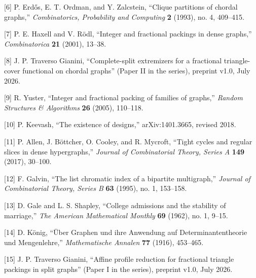\documentclass[
  11pt,
]{article}
\begin{document}
{[}6{]} P. Erdős, E. T. Ordman, and Y. Zalcstein, ``Clique partitions of
chordal graphs,'' \emph{Combinatorics, Probability and Computing}
\textbf{2} (1993), no. 4, 409--415.

{[}7{]} P. E. Haxell and V. Rödl, ``Integer and fractional packings in
dense graphs,'' \emph{Combinatorica} \textbf{21} (2001), 13--38.

{[}8{]} J. P. Traverso Gianini, ``Complete-split extremizers for a
fractional triangle-cover functional on chordal graphs'' (Paper II in
the series), preprint v1.0, July 2026.

{[}9{]} R. Yuster, ``Integer and fractional packing of families of
graphs,'' \emph{Random Structures \& Algorithms} \textbf{26} (2005),
110--118.

{[}10{]} P. Keevash, ``The existence of designs,'' arXiv:1401.3665,
revised 2018.

{[}11{]} P. Allen, J. Böttcher, O. Cooley, and R. Mycroft, ``Tight
cycles and regular slices in dense hypergraphs,'' \emph{Journal of
Combinatorial Theory, Series A} \textbf{149} (2017), 30--100.

{[}12{]} F. Galvin, ``The list chromatic index of a bipartite
multigraph,'' \emph{Journal of Combinatorial Theory, Series B}
\textbf{63} (1995), no. 1, 153--158.

{[}13{]} D. Gale and L. S. Shapley, ``College admissions and the
stability of marriage,'' \emph{The American Mathematical Monthly}
\textbf{69} (1962), no. 1, 9--15.

{[}14{]} D. König, ``Über Graphen und ihre Anwendung auf
Determinantentheorie und Mengenlehre,'' \emph{Mathematische Annalen}
\textbf{77} (1916), 453--465.

{[}15{]} J. P. Traverso Gianini, ``Affine profile reduction for
fractional triangle packings in split graphs'' (Paper I in the series),
preprint v1.0, July 2026.
\end{document}
